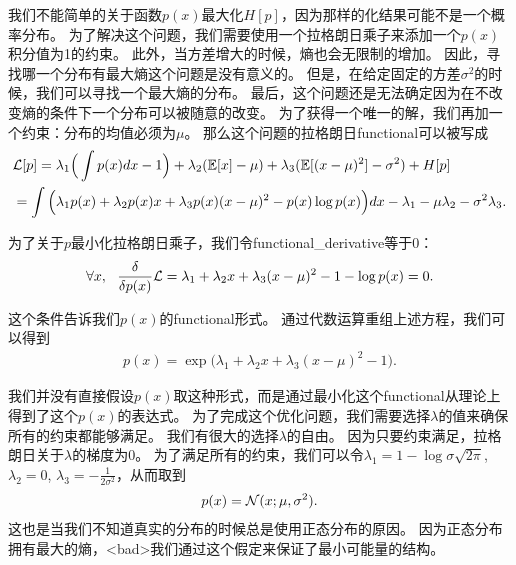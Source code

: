 我们不能简单的关于函数$p(x)$最大化$H[p]$，因为那样的化结果可能不是一个概率分布。
为了解决这个问题，我们需要使用一个拉格朗日乘子来添加一个$p(x)$积分值为1的约束。
此外，当方差增大的时候，熵也会无限制的增加。
因此，寻找哪一个分布有最大熵这个问题是没有意义的。
但是，在给定固定的方差$\sigma^2$的时候，我们可以寻找一个最大熵的分布。
最后，这个问题还是无法确定因为在不改变熵的条件下一个分布可以被随意的改变。
为了获得一个唯一的解，我们再加一个约束：分布的均值必须为$\mu$。
那么这个问题的拉格朗日\gls{functional}可以被写成
\begin{align}
\label{eqn:1950}
&		\mathcal{L}[p] =  \lambda_1 \Big(\int p(x)dx - 1\Big)  + \lambda_2 (\mathbb{E}[x] - \mu) +  \lambda_3 (\mathbb{E}[(x-\mu)^2] - \sigma^2)  + H[p]\\
& =  \int \Big(\lambda_1 p(x) + \lambda_2 p(x)x + \lambda_3 p(x)(x-\mu)^2 - p(x)\log p(x) \Big)dx - \lambda_1 - \mu \lambda_2 - \sigma^2\lambda_3.
\end{align}


为了关于$p$最小化拉格朗日乘子，我们令\gls{functional_derivative}等于0：
\begin{align}
\label{eqn:1952}
	\forall x,\ \  \frac{\delta}{\delta p(x)} \mathcal{L} = \lambda_1 + \lambda_2 x + \lambda_3(x-\mu)^2 - 1 - \log p(x) = 0 .
\end{align}


这个条件告诉我们$p(x)$的\gls{functional}形式。
通过代数运算重组上述方程，我们可以得到
\begin{align}
\label{eqn:1953}
	p(x) = \exp\big(\lambda_1 + \lambda_2 x + \lambda_3 (x-\mu)^2  - 1\big).
\end{align}

我们并没有直接假设$p(x)$取这种形式，而是通过最小化这个\gls{functional}从理论上得到了这个$p(x)$的表达式。
为了完成这个优化问题，我们需要选择$\lambda$的值来确保所有的约束都能够满足。
我们有很大的选择$\lambda$的自由。
因为只要约束满足，拉格朗日关于$\lambda$的梯度为$0$。
为了满足所有的约束，我们可以令$\lambda_1 = 1 - \log \sigma\sqrt{2\pi}$,$\lambda_2 = 0$, $\lambda_3 = - \frac{1}{2\sigma^2}$，从而取到
\begin{align}
\label{eqn:1954}
	p(x) = \mathcal{N}(x;\mu,\sigma^2).
\end{align}
这也是当我们不知道真实的分布的时候总是使用正态分布的原因。
因为正态分布拥有最大的熵，<bad>我们通过这个假定来保证了最小可能量的结构。



